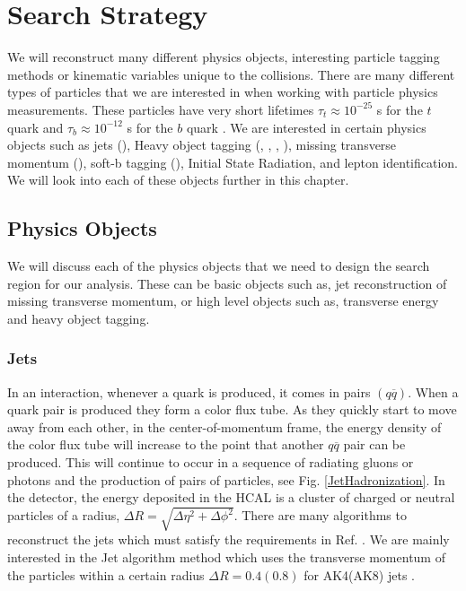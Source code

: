 \chapter{Search Strategy}
\label{ch:SearchStrategy}

We will reconstruct many different physics objects, interesting particle tagging methods or kinematic variables unique to the collisions. There are many different types of particles that we are interested in when working with particle physics measurements. These particles have very short lifetimes $\tau_t\approx10^{-25}$ s for the $t$ quark \cite{quadt_top_2007} and $\tau_b\approx10^{-12}$ s for the $b$ quark \cite{lenz_lifetimes_2019}. We are interested in certain physics objects such as jets (\nj), Heavy object tagging (\nb, \nt, \nrt, \nw), missing transverse momentum (\met), soft-b tagging (\nsv), Initial State Radiation, and lepton identification. We will look into each of these objects further in this chapter.

 
 \section{Physics Objects}\label{PhysObj}
 We will discuss each of the physics objects that we need to design the search region for our analysis. These can be basic objects such as, jet reconstruction of missing transverse momentum, or high level objects such as, transverse energy and heavy object tagging.

\subsection{Jets}\label{Jets}
In an interaction, whenever a quark is produced, it comes in pairs $(q\overline{q})$. When a quark pair is produced they form a color flux tube. As they quickly start to move away from each other, in the center-of-momentum frame, the energy density of the color flux tube will increase to the point that another $q\overline{q}$ pair can be produced. This will continue to occur in a sequence of radiating gluons or photons and the production of pairs of particles, see Fig. \ref{JetHadronization}. 
In the detector, the energy deposited in the HCAL is a cluster of charged or neutral particles of a radius, $\Delta R=\sqrt{\Delta\eta^2+\Delta\phi^2}$. There are many algorithms to reconstruct the jets which must satisfy the requirements in Ref. \cite{noauthor_jet_2010}. We are mainly interested in the \antikt{} Jet algorithm \cite{cacciari_anti-ktjet_2008} method which uses the transverse momentum of the particles within a certain radius $\Delta R = 0.4 (0.8)$ for AK4(AK8) jets \cite{noauthor_https://twiki.cern.ch/twiki/bin/view/cms/jetid_nodate, noauthor_https://twiki.cern.ch/twiki/bin/view/cms/introtojec_nodate}. 

